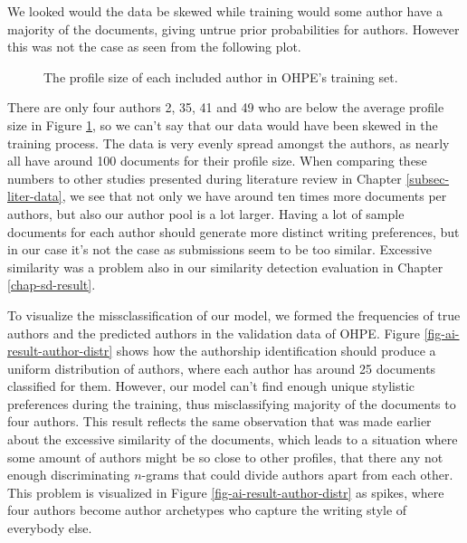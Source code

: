 We looked would the data be skewed while training \ie would some author have a majority of the documents, giving untrue prior probabilities for authors. However this was not the case as seen from the following plot.

\begin{figure}[ht]
    \centering
    \setlength\figureheight{5.5cm}
    \setlength\figurewidth{\textwidth}
    
    \caption{The profile size of each included author in OHPE's training set.}
    \label{fig-author-to-document-dist-ohpe}
\end{figure}

\noindent
There are only four authors 2, 35, 41 and 49 who are below the average profile size in Figure \ref{fig-author-to-document-dist-ohpe}, so we can't say that our data would have been skewed in the training process. The data is very evenly spread amongst the authors, as nearly all have around 100 documents for their profile size. When comparing these numbers to other studies presented during literature review in Chapter \ref{subsec-liter-data}, we see that not only we have around ten times more documents per authors, but also our author pool is a lot larger. Having a lot of sample documents for each author should generate more distinct writing preferences, but in our case it's not the case as submissions seem to be too similar. Excessive similarity was a problem also in our similarity detection evaluation in Chapter \ref{chap-sd-result}.


To visualize the missclassification of our model, we formed the frequencies of true authors and the predicted authors in the validation data of OHPE. Figure \ref{fig-ai-result-author-distr} shows how the authorship identification should produce a uniform distribution of authors, where each author has around 25 documents classified for them. However, our model can't find enough unique stylistic preferences during the training, thus misclassifying majority of the documents to four authors. This result reflects the same observation that was made earlier about the excessive similarity of the documents, which leads to a situation where some amount of authors might be so close to other profiles, that there any not enough discriminating $n$-grams that could divide authors apart from each other. This problem is visualized in Figure \ref{fig-ai-result-author-distr} as spikes, where four authors become author archetypes who capture the writing style of everybody else.

\newpage

